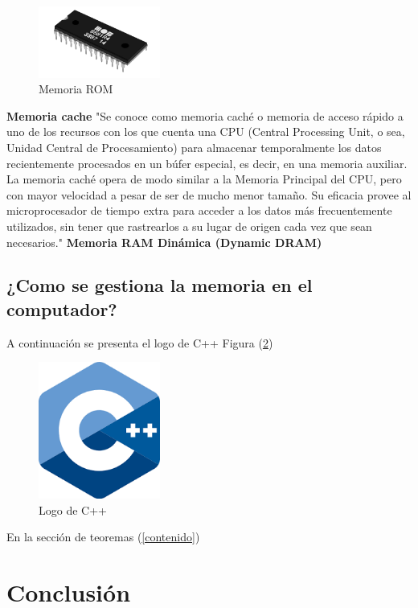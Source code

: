 \documentclass{article}
\begin{document}
\begin{figure}[h]
\includegraphics[width=4cm]{memoria-ROM.jpg}\centering
\caption{Memoria ROM}
\label{fig:memoria-ROM}
\end{figure}
\newline 
\newline 
\textbf{Memoria cache}
\newline
\newline
"Se conoce como memoria caché o memoria de acceso rápido a uno de los recursos con los que cuenta una CPU (Central Processing Unit, o sea, Unidad Central de Procesamiento) para almacenar temporalmente los datos recientemente procesados en un búfer especial, es decir, en una memoria auxiliar.
\newline
La memoria caché opera de modo similar a la Memoria Principal del CPU, pero con mayor velocidad a pesar de ser de mucho menor tamaño. Su eficacia provee al microprocesador de tiempo extra para acceder a los datos más frecuentemente utilizados, sin tener que rastrearlos a su lugar de origen cada vez que sean necesarios."\cite{Cache}
\newline
\newline
\textbf{Memoria RAM Dinámica (Dynamic DRAM)}
\newline
\subsection{¿Como se gestiona la memoria en el computador?}

A continuación se presenta el logo de C++ Figura (\ref{fig:cpplogo})

\begin{figure}[h]
\includegraphics[width=4cm]{cpplogo.png}
\centering
\caption{Logo de C++}
\label{fig:cpplogo}
\end{figure}

En la sección de teoremas (\ref{contenido})

\section{Conclusión} \label{conclulsion}



\end{document}
